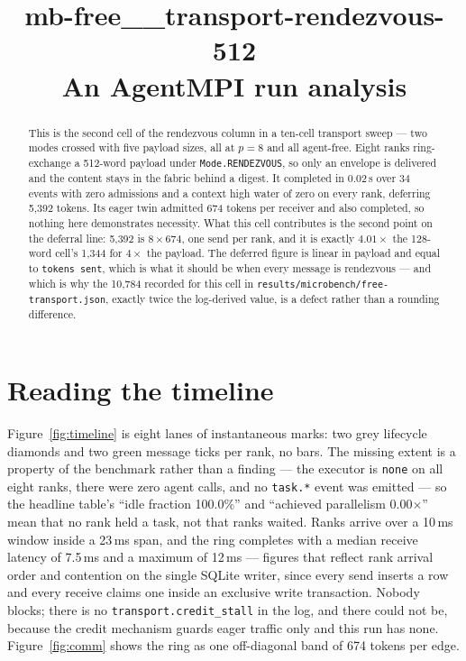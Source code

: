 \documentclass[11pt]{article}
\title{\textbf{mb-free\_\_transport-rendezvous-512}\\[2pt]\large An AgentMPI run analysis}
\author{}
\date{}
\begin{document}
\maketitle

\begin{abstract}
This is the second cell of the rendezvous column in a ten-cell transport sweep ---
two modes crossed with five payload sizes, all at $p = 8$ and all agent-free. Eight
ranks ring-exchange a 512-word payload under \texttt{Mode.RENDEZVOUS}, so only an
envelope is delivered and the content stays in the fabric behind a digest. It
completed in 0.02\,s over 34 events with zero admissions and a context high water of
zero on every rank, deferring 5{,}392 tokens. Its eager twin admitted 674 tokens per
receiver and also completed, so nothing here demonstrates necessity. What this cell
contributes is the second point on the deferral line: 5{,}392 is $8 \times 674$, one
send per rank, and it is exactly $4.01\times$ the 128-word cell's 1{,}344 for
$4\times$ the payload. The deferred figure is linear in payload and equal to
\texttt{tokens sent}, which is what it should be when every message is rendezvous ---
and which is why the 10{,}784 recorded for this cell in
\texttt{results/microbench/free-transport.json}, exactly twice the log-derived value,
is a defect rather than a rounding difference.
\end{abstract}



\section{Reading the timeline}

Figure~\ref{fig:timeline} is eight lanes of instantaneous marks: two grey lifecycle
diamonds and two green message ticks per rank, no bars. The missing extent is a
property of the benchmark rather than a finding --- the executor is \texttt{none} on
all eight ranks, there were zero agent calls, and no \texttt{task.*} event was
emitted --- so the headline table's ``idle fraction 100.0\%'' and ``achieved
parallelism 0.00$\times$'' mean that no rank held a task, not that ranks waited.
Ranks arrive over a 10\,ms window inside a 23\,ms span, and the ring completes with a
median receive latency of 7.5\,ms and a maximum of 12\,ms --- figures that reflect
rank arrival order and contention on the single SQLite writer, since every send
inserts a row and every receive claims one inside an exclusive write transaction.
Nobody blocks; there is no
\texttt{transport.credit\_stall} in the log, and there could not be, because the
credit mechanism guards eager traffic only and this run has none.
Figure~\ref{fig:comm} shows the ring as one off-diagonal band of 674 tokens per edge.
\end{document}

